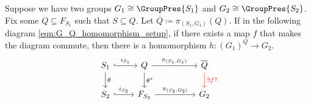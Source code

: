 \begin{theorem}
	Suppose we have two groups $G_1 \cong \GroupPres{S_1}$ and $G_2 \cong \GroupPres{S_2}$.
	Fix some $Q \subseteq F_{S_1}$ such that  $S \subseteq Q$.
	Let $\overline{Q} \coloneqq \pi_{(S_1, G_1)}(Q) $.
	If in the following diagram \eqref{eqn:G_Q_homomorphism_setup}, if there exists a map $f$ that makes the diagram commute, then there is a homomorphism $h \colon (G_1)^Q \to G_2$.
	\begin{equation}
		\begin{tikzcd}
			S_1 \ar[d, "\theta"] \ar[r, hook, "i_{S_1}"] & Q \ar[d, "\theta^*"] \ar[rr, "\pi_{(S_1,G_1)}"] & & \overline{Q} \ar[d, color=red, "\exists f ?"] \\
			S_2 \ar[r, hook, "i_{S_2}"] & F_{S_2} \ar[rr, "\pi_{(S_2,G_2)}"] & & G_2
		\end{tikzcd}
		\label{eqn:G_Q_homomorphism_setup}
	\end{equation}
	\label{thm:G_Q_homomorphism}
\end{theorem}


